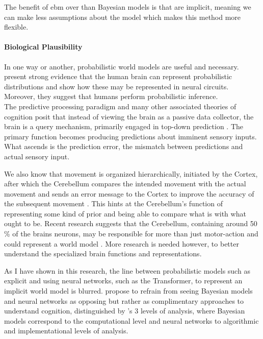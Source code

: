 The benefit of \acrlong{ebm} over than Bayesian models is that  are implicit, meaning we can make less assumptions about the model which makes this method more flexible.

\paragraph*{Biological Plausibility}
In one way or another, probabilistic world models are useful and necessary. \citet{Pouget_Beck_Ma_Latham_2013} present strong evidence that the human brain can represent probabilistic distributions and show how these may be represented in neural circuits. Moreover, they suggest that humans perform probabilistic inference. \\
The predictive processing paradigm and many other associated theories of cognition posit that instead of viewing the brain as a passive data collector, the brain is a query mechanism, primarily engaged in top-down prediction \cite{bottemannePredictiveMindIntroduction2022,caucheteuxEvidencePredictiveCoding2023,mazzagliaFreeEnergyPrinciple2022}. The primary function becomes producing predictions about imminent sensory inputs. What ascends is the prediction error, the mismatch between predictions and actual sensory input.

We also know that movement is organized hierarchically, initiated by the Cortex, after which the Cerebellum compares the intended movement with the actual movement and sends an error message to the Cortex to improve the accuracy of the subsequent movement \cite{kolb2001introduction}. This hints at the Cerebellum's function of representing some kind of prior and being able to compare what is with what ought to be. 
Recent research suggests that the Cerebellum, containing around 50 \% of the brains neurons, may be responsible for more than just motor-action and could represent a world model \cite{silverCognitiveNeuroscienceFunctional2018,Strick_Dum_Fiez_2009, Tee_Taylor_2019}. More research is needed however, to better understand the specialized brain functions and representations.

As I have shown in this research, the line between probabilistic models such as explicit  and using neural networks, such as the Transformer, to represent an implicit world model is blurred. 
\citet{Griffiths_Zhu_Grant_McCoy_2023} propose to refrain from seeing Bayesian models and neural networks as opposing but rather as complimentary approaches to understand cognition, distinguished by \citeauthor{marr1976understanding}'s \cite{marr1976understanding} 3 levels of analysis, where Bayesian models correspond to the computational level and neural networks to algorithmic and implementational levels of analysis. 


